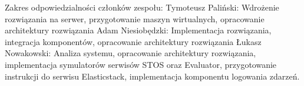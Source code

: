 Zakres odpowiedzialności członków zespołu:
\newline Tymoteusz Paliński:
\newline Wdrożenie rozwiązania na serwer, przygotowanie maszyn wirtualnych, opracowanie architektury rozwiązania
\newline Adam Niesiobędzki: 
\newline Implementacja rozwiązania, integracja komponentów, opracowanie architektury rozwiązania
\newline Łukasz Nowakowski:
\newline Analiza systemu, opracowanie architektury rozwiązania, implementacja symulatorów serwisów STOS oraz Evaluator, przygotowanie instrukcji do serwisu Elasticstack, implementacja komponentu logowania zdarzeń.